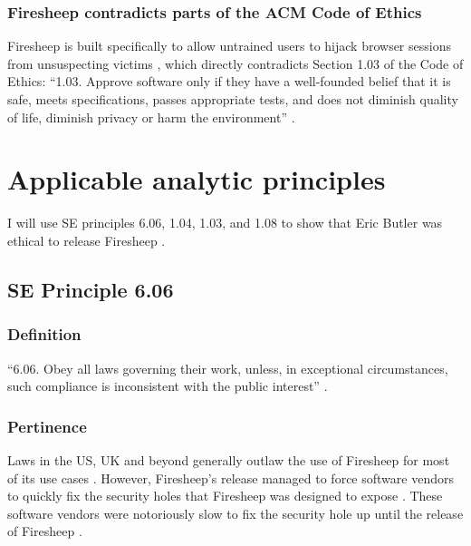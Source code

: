 \documentclass[12pt]{article}
\begin{document}
\subsubsection{Firesheep contradicts parts of the ACM Code of Ethics}
Firesheep is built specifically to allow untrained users to hijack browser sessions from unsuspecting victims \cite{eric-butler}, which directly contradicts Section 1.03 of the Code of Ethics: ``1.03. Approve software only if they have a well-founded belief that it is safe, meets specifications, passes appropriate tests, and does not diminish quality of life, diminish privacy or harm the environment'' \cite{se-code}. 


\section{Applicable analytic principles}
I will use SE principles 6.06, 1.04, 1.03, and 1.08 to show that Eric Butler was ethical to release Firesheep \cite{se-code}.

\subsection{SE Principle 6.06}
\subsubsection{Definition}
``6.06. Obey all laws governing their work, unless, in exceptional circumstances, such compliance is inconsistent with the public interest'' \cite{se-code}.
\subsubsection{Pertinence}
Laws in the US, UK and beyond generally outlaw the use of Firesheep for most of its use cases \cite{illegal-to-use-firesheep} \cite{illegal-to-use-firesheep-uk}. However, Firesheep's release managed to force software vendors to quickly fix the security holes that Firesheep was designed to expose \cite{disconnect-blog}. These software vendors were notoriously slow to fix the security hole up until the release of Firesheep \cite{disconnect-blog}. 
\end{document}

